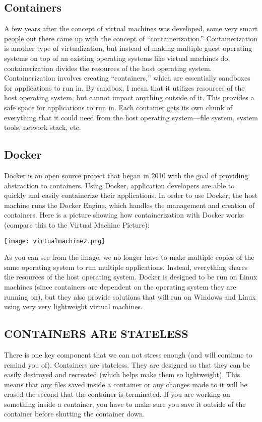 \subsection{Containers}
A few years after the concept of virtual machines was developed, some very smart people out there came up with the concept of ``containerization.'' Containerization is another type of virtualization, but instead of making multiple guest operating systems on top of an existing operating systems like virtual machines do, containerization divides the resources of the host operating system. Containerization involves creating ``containers,'' which are essentially sandboxes for applications to run in. By sandbox, I mean that it utilizes resources of the host operating system, but cannot impact anything outside of it. This provides a safe space for applications to run in. Each container gets its own chunk of everything that it could need from the host operating system---file system, system tools, network stack, etc.

\subsection{Docker}
Docker is an open source project that began in 2010 with the goal of providing abstraction to containers. Using Docker, application developers are able to quickly and easily containerize their applications. In order to use Docker, the host machine runs the Docker Engine, which handles the management and creation of containers. Here is a picture showing how containerization with Docker works (compare this to the Virtual Machine Picture):
\begin{center}
    \texttt{[image: virtualmachine2.png]}
\end{center}
As you can see from the image, we no longer have to make multiple copies of the same operating system to run multiple applications. Instead, everything shares the resources of the host operating system.
Docker is designed to be run on Linux machines (since containers are dependent on the operating system they are running on), but they also provide solutions that will run on Windows and Linux using very very lightweight virtual machines.

\subsection{CONTAINERS ARE STATELESS}
There is one key component that we can not stress enough (and will continue to remind you of). Containers are stateless. They are designed so that they can be easily destroyed and recreated (which helps make them so lightweight). This means that any files saved inside a container or any changes made to it will be erased the second that the container is terminated. If you are working on something inside a container, you have to make sure you save it outside of the container before shutting the container down.





